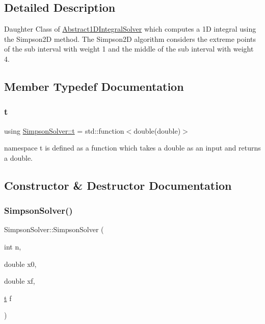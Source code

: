 \subsection{Detailed Description}
Daughter Class of \hyperlink{class_abstract1_d_integral_solver}{Abstract1\+D\+Integral\+Solver} which computes a 1D integral using the Simpson2D method. The Simpson2D algorithm considers the extreme points of the sub interval with weight 1 and the middle of the sub interval with weight 4. 

\subsection{Member Typedef Documentation}
\mbox{\label{class_simpson_solver_aa31ea3c884d669836ba1d0399aa53479}} 
\subsubsection{\texorpdfstring{t}{t}}
{\footnotesize\ttfamily using \hyperlink{class_simpson_solver_aa31ea3c884d669836ba1d0399aa53479}{Simpson\+Solver\+::t} =  std\+::function$<$double(double)$>$}

namespace t is defined as a function which takes a double as an input and returns a double. 

\subsection{Constructor \& Destructor Documentation}
\mbox{\label{class_simpson_solver_abc9059969016bce44332013d48baeed2}} 
\subsubsection{\texorpdfstring{Simpson\+Solver()}{SimpsonSolver()}}
{\footnotesize\ttfamily Simpson\+Solver\+::\+Simpson\+Solver (\begin{DoxyParamCaption}\item[{int}]{n,  }\item[{double}]{x0,  }\item[{double}]{xf,  }\item[{\hyperlink{class_abstract1_d_integral_solver_a7d8e60dfe7eb70e5c19dd71ac0b03880}{t}}]{f }\end{DoxyParamCaption})\hspace{0.3cm}{\ttfamily [inline]}}

